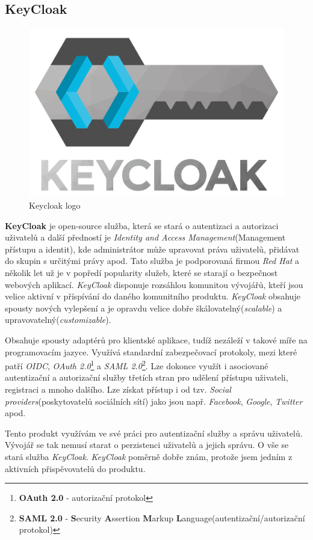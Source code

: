 \newpage
\subsection{KeyCloak}
\label{app_prostredi:keycloak}

\begin{figure}[hbt]
  \centering
  \includegraphics[width=.3 \linewidth]{obrazky-figures/keycloak2.png}
  \caption{Keycloak logo}
\end{figure}

\textbf{KeyCloak} je open-source služba, která se stará o autentizaci a autorizaci uživatelů a další předností je \emph{Identity and Access Management}(Management přístupu a identit), kde administrátor může upravovat práva uživatelů, přidávat do skupin s určitými právy apod.
Tato služba je podporovaná firmou \emph{Red Hat} a několik let už je v popředí popularity služeb, které se starají o bezpečnost webových aplikací. \emph{KeyCloak} disponuje rozsáhlou komunitou vývojářů, kteří jsou velice aktivní v příspívání do daného komunitního produktu.
\emph{KeyCloak} obsahuje spousty nových vylepšení a je opravdu velice dobře škálovatelný(\emph{scalable}) a upravovatelný(\emph{customizable}).

Obsahuje spousty adaptérů pro klientské aplikace, tudíž nezáleží v takové míře na programovacím jazyce.
Využívá standardní zabezpečovací protokoly, mezi které patří \emph{OIDC}, \emph{OAuth 2.0}\footnote{\textbf{OAuth 2.0} - autorizační protokol} a \emph{SAML 2.0}\footnote{\textbf{SAML 2.0} - \textbf{S}ecurity \textbf{A}ssertion \textbf{M}arkup \textbf{L}anguage(autentizační/autorizační protokol)}.
Lze dokonce využít i asociované autentizační a autorizační služby třetích stran pro udělení přístupu uživateli, registraci a mnoho dalšího. Lze získat přístup i od tzv. \emph{Social providers}(poskytovatelů sociálních sítí) jako jsou např. \emph{Facebook}, \emph{Google}, \emph{Twitter} apod.

Tento produkt využívám ve své práci pro autentizační služby a správu uživatelů. Vývojář se tak nemusí starat o perzistenci uživatelů a jejich správu. O vše se stará služba \emph{KeyCloak}.
\emph{KeyCloak} poměrně dobře znám, protože jsem jedním z aktivních přispěvovatelů do produktu.

